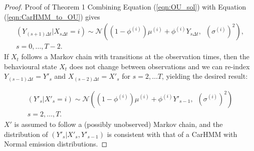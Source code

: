\begin{proof}{Proof of Theorem 1}{}
Combining Equation (\ref{eqn:OU_sol}) with Equation (\ref{eqn:CarHMM_to_OU}) gives
%
\begin{align*}
    \left(Y_{(s+1) \Delta t} | X_{s\Delta t} = i \right) \sim \mathcal{N}\left((1-\phi^{(i)}) \mu^{(i)} + \phi^{(i)} Y_{s \Delta t}, \enspace \left(\sigma^{(i)}\right)^2 \right),\\
    s = 0, \ldots, T-2.
\end{align*}
%
If $X_t$ follows a Markov chain with transitions at the observation times, then the behavioural state $X_t$ does not change between observations and we can re-index $Y_{(s-1) \Delta t} = Y'_s$ and $X_{(s-2)\Delta t} = X'_s$ for $s = 2,\ldots T$, yielding the desired result:

\begin{align*}
    \left(Y'_s| X'_s = i \right) \sim \mathcal{N}\left((1-\phi^{(i)}) \mu^{(i)} + \phi^{(i)} Y'_{s-1}, \enspace \left(\sigma^{(i)}\right)^2 \right)\\
    s = 2, \ldots, T.
\end{align*}
%
$X'$ is assumed to follow a (possibly unobserved) Markov chain, and the distribution of $(Y'_s|X'_s,Y'_{s-1})$ is consistent with that of a CarHMM with Normal emission distributions.
\end{proof}

\fi